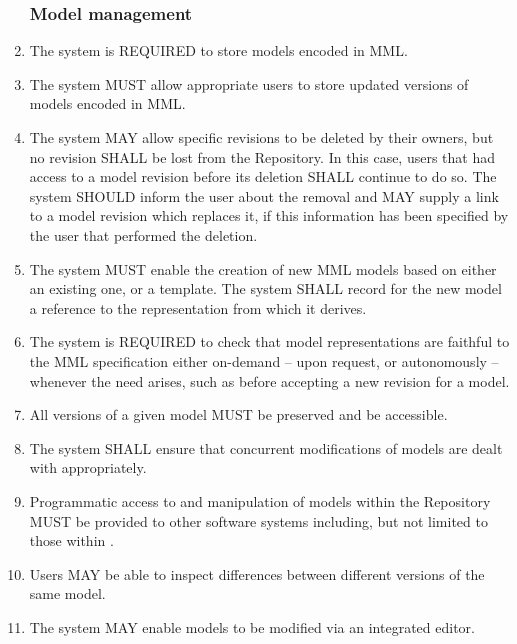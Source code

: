 \begin{enumerate}[1]
\subsubsection{Model management}
\item The system is REQUIRED to store models encoded in MML.

\item The system MUST allow appropriate users to store updated versions of models encoded in MML.

\item The system MAY allow specific revisions to be deleted by their owners, but no revision SHALL be lost from the Repository. In this case, users that had access to a model revision before its deletion SHALL continue to do so. The system SHOULD inform the user about the removal and MAY supply a link to a model revision which replaces it, if this information has been specified by the user that performed the deletion. 

\item The system MUST enable the creation of new MML models based on either an existing one, or a template. The system SHALL record for the new model a reference  to the representation from which it derives.

\item The system is REQUIRED to check that model representations are faithful to the MML specification either on-demand -- upon request, or autonomously -- whenever the need arises, such as before accepting a new revision for a model. 

\item All versions of a given model MUST be preserved and be accessible.

\item The system SHALL ensure that concurrent modifications of models are dealt with appropriately.

\item Programmatic access to and manipulation of models within the Repository MUST be provided to other software systems including, but not limited to those within \ddmore. 

\item Users MAY be able to inspect differences between different versions of the same model.

\item The system MAY enable models to be modified via an integrated editor.


\end{enumerate}
